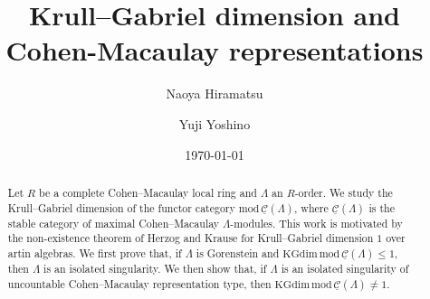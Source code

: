 \documentclass[11pt]{amsart}
\title[Krull--Gabriel dimension and Cohen-Macaulay representations]{Krull--Gabriel dimension and Cohen-Macaulay representations}
\date{\today}
\author{Naoya Hiramatsu}
\author{Yuji Yoshino}
\theoremstyle{definition}
\numberwithin{equation}{section}
\begin{document}
\def\AA{\mathcal A}
\def\add{\mathrm{add}} 
\def\CC{\mathcal C}
\def\CML{{\mathcal C}(\Lambda )} 
\def\CMR{{\mathcal C}(R)} 
\def\Coker{\mathrm{Coker}\,}
\def\colim{\operatorname*{colim}}
\def\End{\mathrm{End}}
\def\Ext{\mathrm{Ext}}
\def\Hom{\mathrm{Hom}}
\def\HomA{\mathrm{Hom}_{\AA}}
\def\HomqA{\mathrm{Hom}_{\AA / \AA_0}}
\def\HomAS{\mathrm{Hom}_{\AA / \SS}}
\def\HomR{\mathrm{Hom}_R}
\def\Im{\mathrm{Im}\,}
\def\Ind{\mathrm{Ind}}
\def\Ker{\mathrm{Ker}\,}
\def\KGdim{\mathrm{KGdim}\,}
\def\m{\mathfrak m}
\def\Mod{\mathrm{Mod}\,}
\def\mod{\mathrm{mod}\,}
\def\ModCC{{\mathrm{Mod}}\,\CC}
\def\modCC{{\mathrm{mod}}\,\CC}
\def\ModsCC{{\mathrm{Mod}}\,\sCC}
\def\modsCC{{\mathrm{mod}}\,\sCC}
\def\ModCML{{\mathrm{Mod}}\,\CML}
\def\modCML{{\mathrm{mod}}\,\CML}
\def\ModsCML{{\mathrm{Mod}}\,\sCML}
\def\modsCML{{\mathrm{mod}}\,\sCML}
\def\modR{{\mathrm{mod}}\,R}
\def\p{\mathfrak p}
\def\q{\mathfrak q}
\def\rad{\mathrm{rad}\,}
\def\SS{\mathcal S} 
\def\Spec{\mathrm{Spec}\,} 
\def\sCC{\underline{\mathcal C}}
\def\sCML{\underline{{\mathcal C}}(\Lambda )}  
\def\sCMR{\underline{{\mathcal C}}(R)}  
\def\sEnd{\underline{\mathrm{End}}}
\def\sHom{\underline{\mathrm{Hom}}}
\def\sHomR{\underline{\mathrm{Hom}}_R}
\def\smod{\underline{\mathrm{mod}}}
\def\soc{{\mathrm{soc}}\,}
\def\Supp{{\mathrm{Supp}}\,}
\def\syz{\mathrm{syz}\,}
\def\top{{\mathrm{top}}\,}
\def\Z{\mathbb Z}

\def\gldim{\mathrm{gl.dim}}
\def\HomL{\mathrm{Hom}_\Lambda}
\def\sHomL{\underline{\mathrm{Hom}}_\Lambda}
\def\LL{\Lambda}
\def\modL{{\mathrm{mod}}\,\Lambda}
\def\PP{\mathcal P}
\def\II{\mathcal I}
\begin{abstract}
Let $R$ be a complete Cohen--Macaulay local ring and $\LL$ an $R$-order. 
We study the Krull--Gabriel dimension of the functor category $\modsCML$, where $\sCML$ is the stable category of maximal Cohen--Macaulay $\LL$-modules. 
This work is motivated by the non-existence theorem of Herzog and Krause for Krull--Gabriel dimension $1$ over artin algebras.  We first prove that, if $\LL$ is Gorenstein and $\KGdim \modsCML \leq 1$, then $\LL$ is an isolated singularity.
We then show that, if $\LL$ is an isolated singularity of uncountable Cohen--Macaulay representation type, then $\KGdim \modsCML \neq 1$.
\end{abstract}
\maketitle
\end{document}
